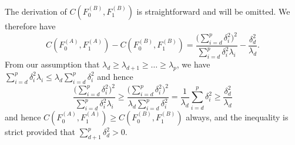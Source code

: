 \documentclass[10pt]{article}
\begin{document}
The derivation of $C(F_0^{(B)}, F_1^{(B)})$ is straightforward and will be omitted.
We therefore have
$$C(F_0^{(A)}, F_1^{(A)}) - C(F_0^{(B)}, F_1^{(B)}) = \frac{\bigl(\sum_{i=d}^{p} \delta_i^{2}\bigr)^{2}}{\sum_{i=d}^{p} \delta_i^{2} \lambda_i} - \frac{\delta_{d}^{2}}{\lambda_d}.$$
From our assumption that $\lambda_d \geq \lambda_{d+1} \geq \dots \geq \lambda_{p}$, we have $\sum_{i=d}^{p} \delta_i^{2} \lambda_i \leq \lambda_{d} \sum_{i=d}^{p} \delta_{i}^{2}$
and hence
$$ \frac{\bigl(\sum_{i=d}^{p} \delta_i^{2}\bigr)^{2}}{\sum_{i=d}^{p} \delta_i^{2} \lambda_i} \geq \frac{\bigl(\sum_{i=d}^{p} \delta_{i}^{2}\bigr)^{2}}{\lambda_d \sum_{i=d}^{p} \delta_i^{2}} = \frac{1}{\lambda_d} \sum_{i=d}^{p} \delta_i^{2} \geq \frac{\delta_{d}^2}{\lambda_d} $$
and hence $C(F_0^{(A)}, F_1^{(A)}) \geq C(F_0^{(B)}, F_1^{(B)})$ always, and the inequality is strict provided that $\sum_{d+1}^{p} \delta_d^2 > 0$.
\end{document}
